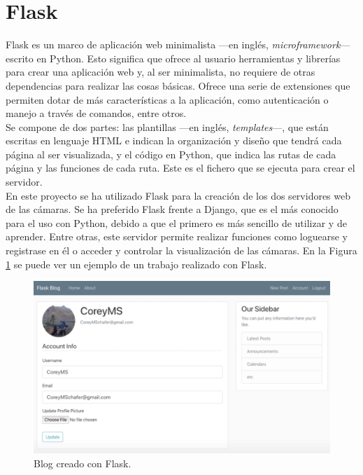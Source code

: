 \section{Flask}
\label{sec:flask}
Flask es un marco de aplicación web minimalista ---en inglés, \textit{microframework}--- escrito en Python. Esto significa que ofrece al usuario herramientas y librerías para crear una aplicación web y, al ser minimalista, no requiere de otras dependencias para realizar las cosas básicas. Ofrece una serie de extensiones que permiten dotar de más características a la aplicación, como autenticación o manejo a través de comandos, entre otros.\\

Se compone de dos partes: las plantillas ---en inglés, \textit{templates}---, que están escritas en lenguaje HTML e indican la organización y diseño que tendrá cada página al ser visualizada, y el código en Python, que indica las rutas de cada página y las funciones de cada ruta. Este es el fichero que se ejecuta para crear el servidor.\\

En este proyecto se ha utilizado Flask para la creación de los dos servidores web de las cámaras. Se ha preferido Flask frente a Django, que es el más conocido para el uso con Python, debido a que el primero es más sencillo de utilizar y de aprender. Entre otras, este servidor permite realizar funciones como loguearse y registrase en él o acceder y controlar la visualización de las cámaras. En la Figura \ref{fig:flask-internet} se puede ver un ejemplo de un trabajo realizado con Flask.\\
\begin{figure} [h!]
  \begin{center}
    \includegraphics[width=15cm]{figs/flask-internet}
  \end{center}
  \caption{Blog creado con Flask.}
  \label{fig:flask-internet}
\end{figure}

